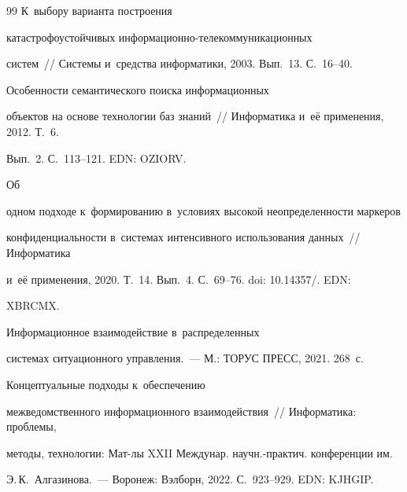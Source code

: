 {{\begin{thebibliography}{99}
 К~выбору варианта построения 


катастрофоустойчивых ин\-фор\-ма\-ци\-он\-но-те\-ле\-ком\-му\-ни\-ка\-ци\-он\-ных  


сис\-тем~/\!\!/ Системы и~средства информатики, 2003. Вып.~13. С.~16--40.




 Особенности семантического поиска информационных 


объектов на основе технологии баз знаний~/\!\!/ Информатика и~её применения, 2012. Т.~6. 


Вып.~2. С.~113--121. EDN: OZIORV.







 Об 


одном подходе к~формированию в~условиях высокой неопределенности маркеров 


конфиденциальности в~сис\-те\-мах интенсивного использования данных~/\!\!/ Информатика 


и~её применения, 2020. Т.~14. Вып.~4. С.~69--76. doi: 10.14357\!/. EDN: 


XBRCMX.


        




 Информационное взаимодействие в~распределенных 


системах ситуационного управ\-ле\-ния.~--- М.: ТОРУС ПРЕСС, 2021. 268~с.







 Концептуальные подходы к~обеспечению 


межведомственного информационного взаимодействия~/\!\!/ Информатика: проблемы, 


методы, технологии: Мат-лы XXII Междунар. научн.-практич. конференции им.\ 


Э.\,К.~Алгазинова.~--- Воронеж: Вэлборн, 2022. С.~923--929. EDN: KJHGIP.\end{thebibliography}


} }












